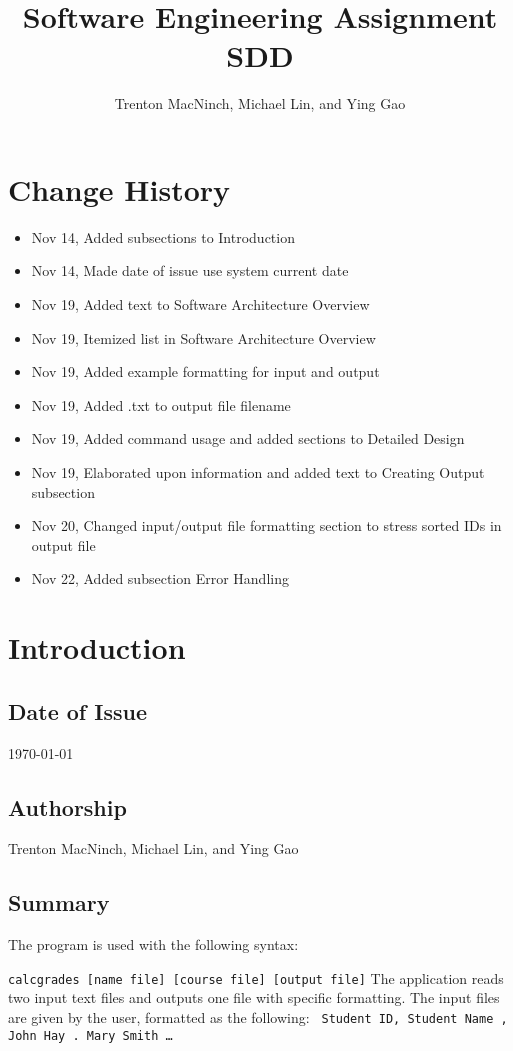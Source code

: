 \documentclass{article}
\title{\textbf{Software Engineering Assignment SDD}}
\author{Trenton MacNinch, Michael Lin, and Ying Gao}
\begin{document}
\maketitle
\newpage

\tableofcontents
\newpage

\section{Change History}
\begin{itemize}
\item Nov 14, Added subsections to Introduction
\item Nov 14, Made date of issue use system current date
\item Nov 19, Added text to Software Architecture Overview
\item Nov 19, Itemized list in Software Architecture Overview
\item Nov 19, Added example formatting for input and output
\item Nov 19, Added .txt to output file filename
\item Nov 19, Added command usage and added sections to Detailed Design
\item Nov 19, Elaborated upon information and added text to Creating Output subsection
\item Nov 20, Changed input/output file formatting section to stress sorted IDs in output file
\item Nov 22, Added subsection Error Handling
\end{itemize}

\section{Introduction}
\subsection{Date of Issue}
\today
\subsection{Authorship}
Trenton MacNinch, Michael Lin, and Ying Gao
\subsection{Summary}
The program is used with the following syntax:

\texttt{calcgrades [name file] [course file] [output file]}
\newline \newline
The application reads two input text files and outputs one file with specific formatting.
The input files are given by the user, formatted as the following:
\texttt{  \newline
  Student ID, Student Name , John Hay . Mary Smith \newline
  \ldots
}
\end{document}
